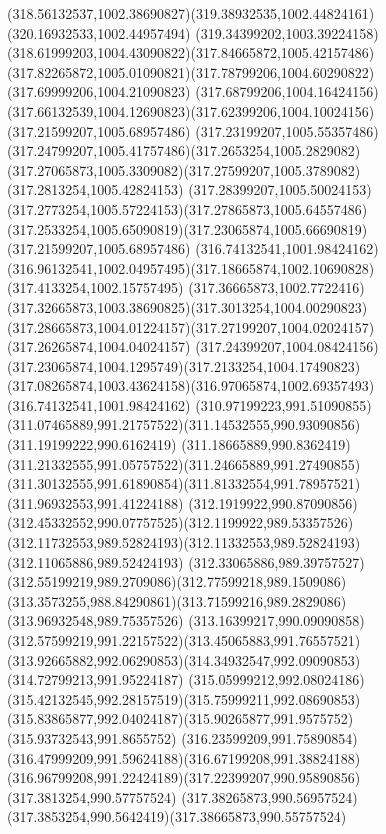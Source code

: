 {{		\curveto(318.56132537,1002.38690827)(319.38932535,1002.44824161)(320.16932533,1002.44957494)
		\curveto(319.34399202,1003.39224158)(318.61999203,1004.43090822)(317.84665872,1005.42157486)
		\curveto(317.82265872,1005.01090821)(317.78799206,1004.60290822)(317.69999206,1004.21090823)
		\curveto(317.68799206,1004.16424156)(317.66132539,1004.12690823)(317.62399206,1004.10024156)
		\moveto(317.21599207,1005.68957486)
		\curveto(317.23199207,1005.55357486)(317.24799207,1005.41757486)(317.2653254,1005.2829082)
		\curveto(317.27065873,1005.3309082)(317.27599207,1005.3789082)(317.2813254,1005.42824153)
		\curveto(317.28399207,1005.50024153)(317.2773254,1005.57224153)(317.27865873,1005.64557486)
		\curveto(317.2533254,1005.65090819)(317.23065874,1005.66690819)(317.21599207,1005.68957486)
		\moveto(316.74132541,1001.98424162)
		\curveto(316.96132541,1002.04957495)(317.18665874,1002.10690828)(317.4133254,1002.15757495)
		\curveto(317.36665873,1002.7722416)(317.32665873,1003.38690825)(317.3013254,1004.00290823)
		\curveto(317.28665873,1004.01224157)(317.27199207,1004.02024157)(317.26265874,1004.04024157)
		\curveto(317.24399207,1004.08424156)(317.23065874,1004.1295749)(317.2133254,1004.17490823)
		\curveto(317.08265874,1003.43624158)(316.97065874,1002.69357493)(316.74132541,1001.98424162)
		\moveto(310.97199223,991.51090855)
		\curveto(311.07465889,991.21757522)(311.14532555,990.93090856)(311.19199222,990.6162419)
		\curveto(311.18665889,990.8362419)(311.21332555,991.05757522)(311.24665889,991.27490855)
		\curveto(311.30132555,991.61890854)(311.81332554,991.78957521)(311.96932553,991.41224188)
		\curveto(312.1919922,990.87090856)(312.45332552,990.07757525)(312.1199922,989.53357526)
		\curveto(312.11732553,989.52824193)(312.11332553,989.52824193)(312.11065886,989.52424193)
		\curveto(312.33065886,989.39757527)(312.55199219,989.2709086)(312.77599218,989.1509086)
		\curveto(313.3573255,988.84290861)(313.71599216,989.2829086)(313.96932548,989.75357526)
		\curveto(313.16399217,990.09090858)(312.57599219,991.22157522)(313.45065883,991.76557521)
		\curveto(313.92665882,992.06290853)(314.34932547,992.09090853)(314.72799213,991.95224187)
		\curveto(315.05999212,992.08024186)(315.42132545,992.28157519)(315.75999211,992.08690853)
		\curveto(315.83865877,992.04024187)(315.90265877,991.9575752)(315.93732543,991.8655752)
		\curveto(316.23599209,991.75890854)(316.47999209,991.59624188)(316.67199208,991.38824188)
		\curveto(316.96799208,991.22424189)(317.22399207,990.95890856)(317.3813254,990.57757524)
		\curveto(317.38265873,990.56957524)(317.3853254,990.5642419)(317.38665873,990.55757524)
}}
